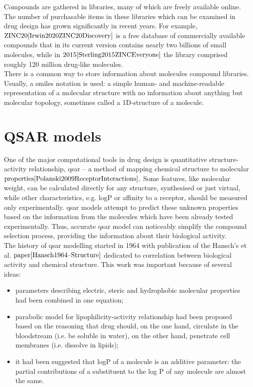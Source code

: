 Compounds are gathered in libraries, many of which are freely available online.
The number of purchasable items in these libraries which can be examined in drug 
design has grown significantly in recent years.
For example, $\text{ZINC20}{\cite{Irwin2020ZINC20Discovery}}$ is a free database 
of commercially available compounds that in its current version contains nearly 
two billions of small molecules, while in $\text{2015}{\cite{Sterling2015ZINCEveryone}}$ 
the library comprised roughly 120 million drug-like molecules.
\hfill\break\\
There is a common way to store information about molecules compound libraries.
Usually, a \acrshort{smiles} notation is used: a simple human- and machine-readable representation 
of a molecular structure with no information about anything but molecular topology, sometimes called a 1D-structure of a molecule. %

\section{QSAR models}
One of the major computational tools in drug design is quantitative structure-activity 
relationship, \acrshort{qsar} -- a method of mapping chemical structure to molecular 
$\text{properties}{\cite{Polanski2009ReceptorInteractions}}$. 
Some features, like molecular weight, can be calculated directly for any structure, 
synthesised or just virtual, while other characteristics, e.g. logP or affinity to a receptor, should be measured 
only experimentally.
\acrshort{qsar} models attempt to predict these unknown properties based on the information from the molecules which have been already tested experimentally.
Thus, accurate \acrshort{qsar} model can noticeably simplify the compound selection 
process, providing the information about their biological activity.\\

The history of \acrshort{qsar} modelling started in 1964 with publication of the 
Hansch's et al. $\text{paper}{\cite{Hansch1964--Structure}}$ dedicated to correlation 
between biological activity and chemical structure.
This work was important because of several ideas:
\begin{itemize}

    \item  parameters describing electric, steric and hydrophobic molecular properties had been combined in one equation;
    \item parabolic model for lipophilicity-activity relationship had been proposed based on the reasoning that drug should, on the one hand, circulate in the bloodstream (i.e. be soluble in water), on the other hand, penetrate cell membranes (i.e. dissolve in lipids); 
    \item it had been suggested that logP of a molecule is an additive parameter: the partial contributions of a substituent to the log P of any molecule are almost the same.
\end{itemize}

